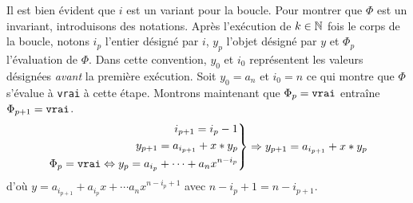 Il est bien évident que $i$ est un variant pour la boucle.\newline
Pour montrer que $\Phi$ est un invariant, introduisons des notations.  Après l'exécution de $k\in \mathbb{N}$ fois le corps de la boucle, notons $i_p$ l'entier désigné par $i$, $y_p$ l'objet désigné par $y$ et $\Phi_p$ l'évaluation de $\Phi$.\newline
Dans cette convention, $y_0$ et $i_0$ représentent les valeurs désignées \emph{avant} la première exécution. Soit $y_0=a_n$ et $i_0=n$ ce qui montre que $\Phi$ s'évalue à \verb|vrai| à cette étape.\newline
Montrons maintenant que $\Phi_p = \verb|vrai|$ entraîne $\Phi_{p+1} = \verb|vrai|$.
\begin{displaymath}
\left. 
\begin{aligned}
i_{p+1} = i_{p} -1\\
  y_{p+1} = a_{i_{p+1}} +x*y_p\\ 
  \Phi_p = \verb|vrai|\Leftrightarrow y_p=a_{i_p}+\cdots+a_nx^{n-i_p}
\end{aligned}
\right\rbrace 
\Rightarrow
y_{p+1} = a_{i_{p+1}} +x*y_p
\end{displaymath}
d'où $y=a_{i_{p+1}} + a_{i_p}x+\cdots a_nx^{n-i_p+1}$ avec $n-i_p +1 = n-i_{p+1}$.